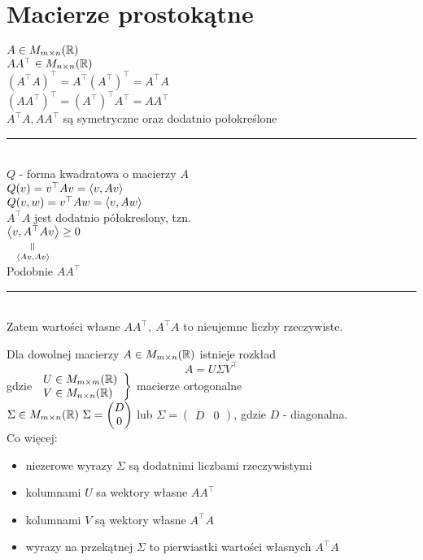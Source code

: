 \section{Macierze prostokątne}
$A \in M_{m \times n}(\mathbb{R})$ \\ 
$AA^\top \in M_{n \times n}(\mathbb{R})$ \\
$(A^\top A)^\top = A^\top (A^\top)^\top = A^\top A$ \\ 
$(AA^\top)^\top = (A^\top)^\top A^\top = AA^\top$ \\ 
$A^\top A, AA^\top$ są symetryczne oraz dodatnio połokreślone \\
\rule{2cm}{0.4pt} \\
$Q$ - forma kwadratowa o macierzy $A$ \\ 
$Q(v) = v^\top A v =\left\langle v, Av \right\rangle$ \\ 
$Q(v,w) = v^\top A w = \left\langle v, Aw \right\rangle$ \\ 
$A^\top A$ jest dodatnio półokreslony, tzn. \\ 
$\underscript{\scp v{A^\top Av}}{\verteq}{\scp{Av}{Av}} \ge 0$ \\ 
Podobnie $AA^\top$ \\
\rule{2cm}{0.4pt} \\
Zatem wartości własne $AA^\top,\ A^\top A$ to nieujemne liczby rzeczywiste. 
\begin{tw}
    Dla dowolnej macierzy $A \in M_{m \times n}(\mathbb{R})$ istnieje rozkład 
    \[ A = U\Sigma V^\top\] 
    gdzie $ \left. \begin{array}{l}
    U \in M_{m \times m}(\mathbb{R}) \\ V \in M_{n \times n}(\mathbb{R}) \end{array}\right \}$ macierze ortogonalne \\ 
    $\Sigma \in M_{m \times n}(\mathbb{R}) \ \Sigma = \begin{pmatrix} D \\ 0 \end{pmatrix}$ lub 
    $\Sigma = \begin{pmatrix} D & 0 \end{pmatrix}$, gdzie $D$ - diagonalna. \\
    Co więcej: 
    \begin{itemize}
    \renewcommand\labelitemi{--}
    \item niezerowe wyrazy $\Sigma$ są dodatnimi liczbami rzeczywistymi 
    \item kolumnami $U$ sa wektory własne $AA^\top$ 
    \item kolumnami $V$ są wektory własne $A^\top A$ 
    \item wyrazy na przekątnej $\Sigma$ to pierwiastki wartości własnych $A^\top A$
    \end{itemize}
\end{tw}
